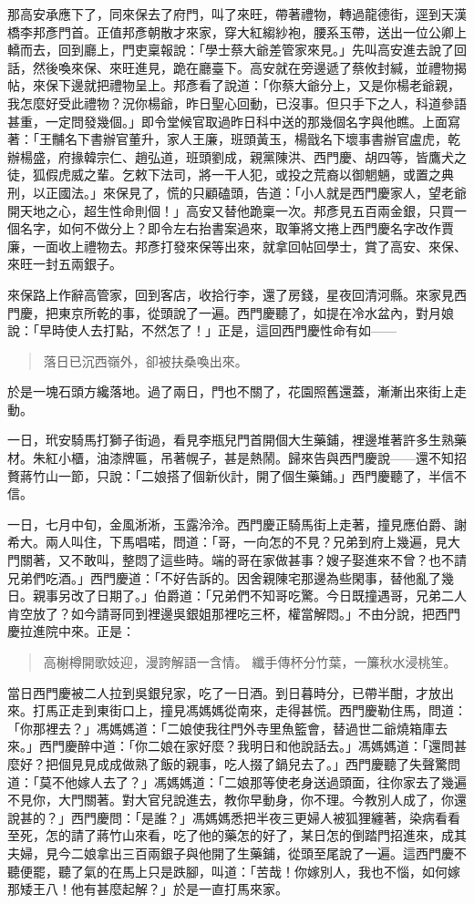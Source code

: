 那高安承應下了，同來保去了府門，叫了來旺，帶著禮物，轉過龍德街，逕到天漢橋李邦彥門首。正值邦彥朝散才來家，穿大紅縐紗袍，腰系玉帶，送出一位公卿上轎而去，回到廳上，門吏稟報說：「學士蔡大爺差管家來見。」先叫高安進去說了回話，然後喚來保、來旺進見，跪在廳臺下。高安就在旁邊遞了蔡攸封緘，並禮物揭帖，來保下邊就把禮物呈上。邦彥看了說道：「你蔡大爺分上，又是你楊老爺親，我怎麼好受此禮物？況你楊爺，昨日聖心回動，已沒事。但只手下之人，科道參語甚重，一定問發幾個。」即令堂候官取過昨日科中送的那幾個名字與他瞧。上面寫著：「王黼名下書辦官董升，家人王廉，班頭黃玉，楊戩名下壞事書辦官盧虎，乾辦楊盛，府掾韓宗仁、趙弘道，班頭劉成，親黨陳洪、西門慶、胡四等，皆鷹犬之徒，狐假虎威之輩。乞敕下法司，將一干人犯，或投之荒裔以御魍魎，或置之典刑，以正國法。」來保見了，慌的只顧磕頭，告道：「小人就是西門慶家人，望老爺開天地之心，超生性命則個！」高安又替他跪稟一次。邦彥見五百兩金銀，只買一個名字，如何不做分上？即令左右抬書案過來，取筆將文捲上西門慶名字改作賈廉，一面收上禮物去。邦彥打發來保等出來，就拿回帖回學士，賞了高安、來保、來旺一封五兩銀子。

來保路上作辭高管家，回到客店，收拾行李，還了房錢，星夜回清河縣。來家見西門慶，把東京所乾的事，從頭說了一遍。西門慶聽了，如提在冷水盆內，對月娘說：「早時使人去打點，不然怎了！」正是，這回西門慶性命有如——
\begin{quote}
落日已沉西嶺外，卻被扶桑喚出來。
\end{quote}

於是一塊石頭方纔落地。過了兩日，門也不關了，花園照舊還蓋，漸漸出來街上走動。

一日，玳安騎馬打獅子街過，看見李瓶兒門首開個大生藥鋪，裡邊堆著許多生熟藥材。朱紅小櫃，油漆牌匾，吊著幌子，甚是熱鬧。歸來告與西門慶說——還不知招贅蔣竹山一節，只說：「二娘搭了個新伙計，開了個生藥鋪。」西門慶聽了，半信不信。

一日，七月中旬，金風淅淅，玉露泠泠。西門慶正騎馬街上走著，撞見應伯爵、謝希大。兩人叫住，下馬唱喏，問道：「哥，一向怎的不見？兄弟到府上幾遍，見大門關著，又不敢叫，整悶了這些時。端的哥在家做甚事？嫂子娶進來不曾？也不請兄弟們吃酒。」西門慶道：「不好告訴的。因舍親陳宅那邊為些閑事，替他亂了幾日。親事另改了日期了。」伯爵道：「兄弟們不知哥吃驚。今日既撞遇哥，兄弟二人肯空放了？如今請哥同到裡邊吳銀姐那裡吃三杯，權當解悶。」不由分說，把西門慶拉進院中來。正是：
\begin{quote}
高榭樽開歌妓迎，漫誇解語一含情。
纖手傳杯分竹葉，一簾秋水浸桃笙。
\end{quote}

當日西門慶被二人拉到吳銀兒家，吃了一日酒。到日暮時分，已帶半酣，才放出來。打馬正走到東街口上，撞見馮媽媽從南來，走得甚慌。西門慶勒住馬，問道：「你那裡去？」馮媽媽道：「二娘使我往門外寺里魚籃會，替過世二爺燒箱庫去來。」西門慶醉中道：「你二娘在家好麼？我明日和他說話去。」馮媽媽道：「還問甚麼好？把個見見成成做熟了飯的親事，吃人掇了鍋兒去了。」西門慶聽了失聲驚問道：「莫不他嫁人去了？」馮媽媽道：「二娘那等使老身送過頭面，往你家去了幾遍不見你，大門關著。對大官兒說進去，教你早動身，你不理。今教別人成了，你還說甚的？」西門慶問：「是誰？」馮媽媽悉把半夜三更婦人被狐狸纏著，染病看看至死，怎的請了蔣竹山來看，吃了他的藥怎的好了，某日怎的倒踏門招進來，成其夫婦，見今二娘拿出三百兩銀子與他開了生藥鋪，從頭至尾說了一遍。這西門慶不聽便罷，聽了氣的在馬上只是跌腳，叫道：「苦哉！你嫁別人，我也不惱，如何嫁那矮王八！他有甚麼起解？」於是一直打馬來家。


